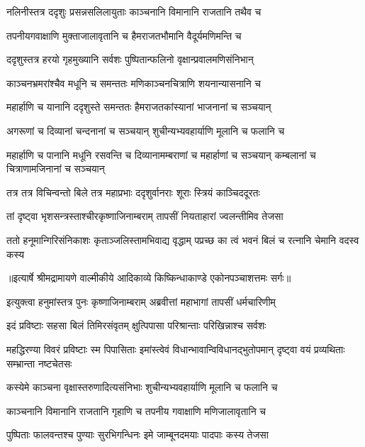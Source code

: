 \twolineshloka
{नलिनीस्तत्र ददृशुः प्रसन्नसलिलायुताः}
{काञ्चनानि विमानानि राजतानि तथैव च} %

\twolineshloka
{तपनीयगवाक्षाणि मुक्ताजालावृतानि च}
{हैमराजतभौमानि वैदूर्यमणिमन्ति च} %

\twolineshloka
{ददृशुस्तत्र हरयो गृहमुख्यानि सर्वशः}
{पुष्पितान्फलिनो वृक्षान्प्रवालमणिसंनिभान्} %

\twolineshloka
{काञ्चनभ्रमरांश्चैव मधूनि च समन्ततः}
{मणिकाञ्चनचित्राणि शयनान्यासनानि च} %

\twolineshloka
{महार्हाणि च यानानि ददृशुस्ते समन्ततः}
{हैमराजतकांस्यानां भाजनानां च सञ्चयान्} %

\twolineshloka
{अगरूणां च दिव्यानां चन्दनानां च सञ्चयान्}
{शुचीन्यभ्यवहार्याणि मूलानि च फलानि च} %

\threelineshloka
{महार्हाणि च पानानि मधूनि रसवन्ति च}
{दिव्यानामम्बराणां च महार्हाणां च सञ्चयान्}
{कम्बलानां च चित्राणामजिनानां च सञ्चयान्} %

\twolineshloka
{तत्र तत्र विचिन्वन्तो बिले तत्र महाप्रभाः}
{ददृशुर्वानराः शूराः स्त्रियं काञ्चिददूरतः} %

\twolineshloka
{तां दृष्ट्वा भृशसन्त्रस्ताश्चीरकृष्णाजिनाम्बराम्}
{तापसीं नियताहारां ज्वलन्तीमिव तेजसा} %

\fourlineindentedshloka
{ततो हनूमान्गिरिसंनिकाशः}
{कृताञ्जलिस्तामभिवाद्य वृद्धाम्}
{पप्रच्छ का त्वं भवनं बिलं च}
{रत्नानि चेमानि वदस्व कस्य} %


{॥इत्यार्षे श्रीमद्रामायणे वाल्मीकीये आदिकाव्ये किष्किन्धाकाण्डे एकोनपञ्चाशत्तमः सर्गः॥}


\twolineshloka
{इत्युक्त्वा हनुमांस्तत्र पुनः कृष्णाजिनाम्बराम्}
{अब्रवीत्तां महाभागां तापसीं धर्मचारिणीम्} %

\twolineshloka
{इदं प्रविष्टाः सहसा बिलं तिमिरसंवृतम्}
{क्षुत्पिपासा परिश्रान्ताः परिखिन्नाश्च सर्वशः} %

\threelineshloka
{महद्धिरण्या विवरं प्रविष्टाः स्म पिपासिताः}
{इमांस्त्वेवं विधान्भावान्विविधानद्भुतोपमान्}
{दृष्ट्वा वयं प्रव्यथिताः सम्भ्रान्ता नष्टचेतसः} %

\twolineshloka
{कस्येमे काञ्चना वृक्षास्तरुणादित्यसंनिभाः}
{शुचीन्यभ्यवहार्याणि मूलानि च फलानि च} %

\twolineshloka
{काञ्चनानि विमानानि राजतानि गृहाणि च}
{तपनीय गवाक्षाणि मणिजालावृतानि च} %

\twolineshloka
{पुष्पिताः फालवन्तश्च पुण्याः सुरभिगन्धिनः}
{इमे जाम्बूनदमयाः पादपाः कस्य तेजसा} %


